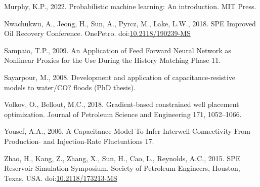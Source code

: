 \documentclass[]{elsarticle} %
\newlength{\cslhangindent}
\newenvironment{CSLReferences}[2] %
 {%
  \setlength{\parindent}{0pt}
  \ifodd #1 \everypar{\setlength{\hangindent}{\cslhangindent}}\ignorespaces\fi
  \ifnum #2 > 0
  \setlength{\parskip}{#2\baselineskip}
  \fi
 }%
 {}
\begin{document}
\begin{CSLReferences}{1}{0}
\leavevmode{}%
Murphy, K.P., 2022. Probabilistic machine learning: An introduction. MIT Press.

\leavevmode{}%
Nwachukwu, A., Jeong, H., Sun, A., Pyrcz, M., Lake, L.W., 2018. SPE Improved Oil Recovery Conference. OnePetro. doi:\href{https://doi.org/10.2118/190239-MS}{10.2118/190239-MS}

\leavevmode{}%
Sampaio, T.P., 2009. An Application of Feed Forward Neural Network as Nonlinear Proxies for the Use During the History Matching Phase 11.

\leavevmode{}%
Sayarpour, M., 2008. Development and application of capacitance-resistive models to water/CO? floods (PhD thesis).

\leavevmode{}%
Volkov, O., Bellout, M.C., 2018. Gradient-based constrained well placement optimization. Journal of Petroleum Science and Engineering 171, 1052--1066.

\leavevmode{}%
Yousef, A.A., 2006. A Capacitance Model To Infer Interwell Connectivity From Production- and Injection-Rate Fluctuations 17.

\leavevmode{}%
Zhao, H., Kang, Z., Zhang, X., Sun, H., Cao, L., Reynolds, A.C., 2015. SPE Reservoir Simulation Symposium. Society of Petroleum Engineers, Houston, Texas, USA. doi:\href{https://doi.org/10.2118/173213-MS}{10.2118/173213-MS}

\end{CSLReferences}
\end{document}
